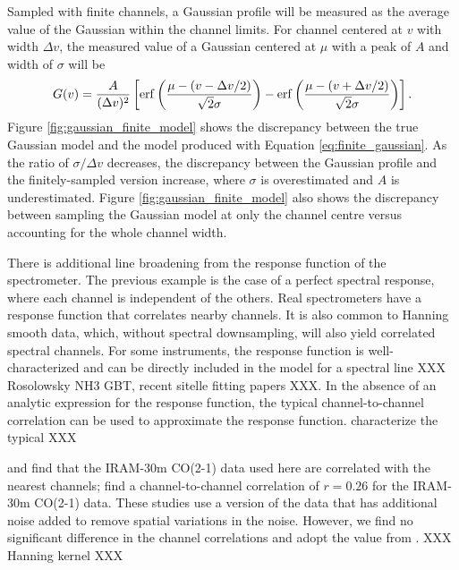 \documentclass{rnaastex}
\begin{document}
Sampled with finite channels, a Gaussian profile will be measured as the average value of the Gaussian within the channel limits.  For channel centered at $v$ with width $\Delta v$, the measured value of a Gaussian centered at $\mu$ with a peak of $A$ and width of $\sigma$ will be
\begin{equation}
    \label{eq:finite_gaussian}
    G(v) = \frac{A}{(\Delta v)^2} \left[ {\rm erf}\left( \frac{\mu - (v - \Delta v / 2)}{\sqrt{2}\sigma} \right) - {\rm erf}\left( \frac{\mu - (v + \Delta v / 2)}{\sqrt{2}\sigma} \right) \right].
\end{equation}
Figure \ref{fig:gaussian_finite_model} shows the discrepancy between the true Gaussian model and the model produced with Equation \ref{eq:finite_gaussian}. As the ratio of $\sigma / \Delta v$ decreases, the discrepancy between the Gaussian profile and the finitely-sampled version increase, where $\sigma$ is overestimated and $A$ is underestimated. Figure \ref{fig:gaussian_finite_model} also shows the discrepancy between sampling the Gaussian model at only the channel centre versus accounting for the whole channel width.


There is additional line broadening from the response function of the spectrometer.  The previous example is the case of a perfect spectral response, where each channel is independent of the others.  Real spectrometers have a response function that correlates nearby channels.  It is also common to Hanning smooth data, which, without spectral downsampling, will also yield correlated spectral channels.  For some instruments, the response function is well-characterized and can be directly included in the model for a spectral line XXX Rosolowsky NH3 GBT, recent sitelle fitting papers XXX.  In the absence of an analytic expression for the response function, the typical channel-to-channel correlation can be used to approximate the response function. \citet{Leroy2016ApJ...831...16L} characterize the typical XXX

\citet{Leroy2016ApJ...831...16L} and \citet{Sun2018ApJ...860..172S} find that the IRAM-30m CO(2-1) data used here are correlated with the nearest channels; \citet{Sun2018ApJ...860..172S} find a channel-to-channel correlation of $r=0.26$ for the IRAM-30m CO(2-1) data.  These studies use a version of the data that has additional noise added to remove spatial variations in the noise.  However, we find no significant difference in the channel correlations and adopt the value from \citet{Sun2018ApJ...860..172S}. XXX Hanning kernel XXX
\end{document}
